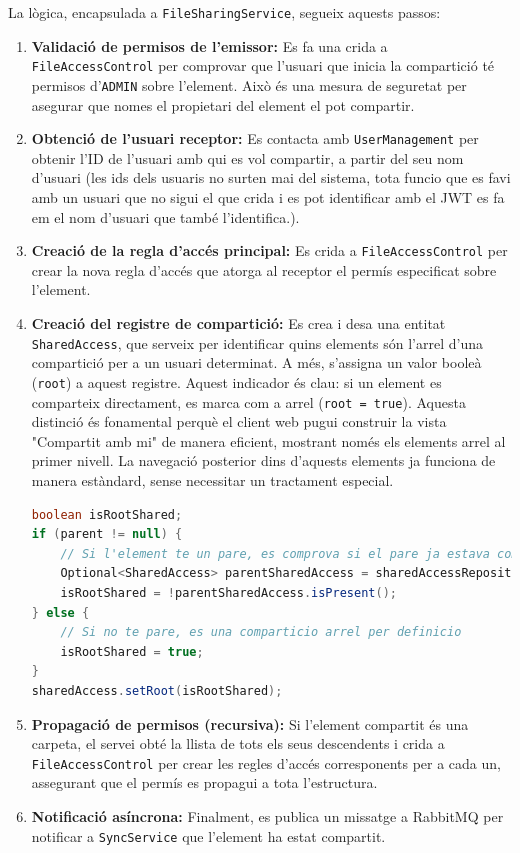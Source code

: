 La lògica, encapsulada a \texttt{FileSharingService}, segueix aquests passos:
\begin{enumerate}
    \item \textbf{Validació de permisos de l'emissor:} Es fa una crida a \texttt{FileAccessControl} per comprovar que l'usuari que inicia la compartició té permisos d'\texttt{ADMIN} sobre l'element. Això és una mesura de seguretat per asegurar que nomes el propietari del element el pot compartir.
    \item \textbf{Obtenció de l'usuari receptor:} Es contacta amb \texttt{UserManagement} per obtenir l'ID de l'usuari amb qui es vol compartir, a partir del seu nom d'usuari (les ids dels usuaris no surten mai del sistema, tota funcio que es favi amb un usuari que no sigui el que crida i es pot identificar amb el JWT es fa em el nom d'usuari que també l'identifica.).
    \item \textbf{Creació de la regla d'accés principal:} Es crida a \texttt{FileAccessControl} per crear la nova regla d'accés que atorga al receptor el permís especificat sobre l'element.
    \item \textbf{Creació del registre de compartició:} Es crea i desa una entitat \texttt{SharedAccess}, que serveix per identificar quins elements són l'arrel d'una compartició per a un usuari determinat. A més, s'assigna un valor booleà (\texttt{root}) a aquest registre. Aquest indicador és clau: si un element es comparteix directament, es marca com a arrel (\texttt{root = true}). Aquesta distinció és fonamental perquè el client web pugui construir la vista "Compartit amb mi" de manera eficient, mostrant només els elements arrel al primer nivell. La navegació posterior dins d'aquests elements ja funciona de manera estàndard, sense necessitar un tractament especial.
    
\begin{lstlisting}[language=Java, caption={Lògica per determinar si una compartició és arrel a `FileSharingService`}]
boolean isRootShared;
if (parent != null) {
    // Si l'element te un pare, es comprova si el pare ja estava compartit amb l'usuari
    Optional<SharedAccess> parentSharedAccess = sharedAccessRepository.findByElementIdAndUserId(parent.getId(), userId);
    isRootShared = !parentSharedAccess.isPresent();
} else {
    // Si no te pare, es una comparticio arrel per definicio
    isRootShared = true;
}
sharedAccess.setRoot(isRootShared);
\end{lstlisting}
    
    \item \textbf{Propagació de permisos (recursiva):} Si l'element compartit és una carpeta, el servei obté la llista de tots els seus descendents i crida a \texttt{FileAccessControl} per crear les regles d'accés corresponents per a cada un, assegurant que el permís es propagui a tota l'estructura.
    \item \textbf{Notificació asíncrona:} Finalment, es publica un missatge a RabbitMQ per notificar a \texttt{SyncService} que l'element ha estat compartit.
\end{enumerate}


